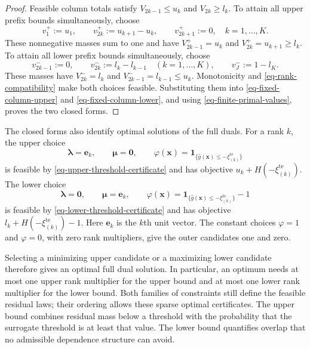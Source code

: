 \documentclass[review,11pt,3p,authoryear,nopreprintline]{elsarticle}
\begin{document}
\begin{proof}
  Feasible column totals satisfy $V_{2k-1}\le u_k$ and $V_{2k}\ge l_k$. To attain all upper prefix bounds simultaneously, choose
  \begin{equation}
    v_1^+:=u_1,\qquad
    v_{2k}^+:=u_{k+1}-u_k,\qquad
    v_{2k+1}^+:=0,\quad k=1,\ldots,K.
    \label{eq-upper-column-allocation}
  \end{equation}
  These nonnegative masses sum to one and have
  $V_{2k-1}^+=u_k$ and $V_{2k}^+=u_{k+1}\ge l_k$.
  To attain all lower prefix bounds simultaneously, choose
  \begin{equation}
    v_{2k-1}^-:=0,\qquad
    v_{2k}^-:=l_k-l_{k-1}\quad(k=1,\ldots,K),
    \qquad v_J^-:=1-l_K.
    \label{eq-lower-column-allocation}
  \end{equation}
  These masses have $V_{2k}^-=l_k$ and
  $V_{2k-1}^-=l_{k-1}\le u_k$.
  Monotonicity and \eqref{eq-rank-compatibility} make both choices feasible. Substituting them into \eqref{eq-fixed-column-upper} and \eqref{eq-fixed-column-lower}, and using \eqref{eq-finite-primal-values}, proves the two closed forms.
\end{proof}

The closed forms also identify optimal solutions of the full duals. For a rank $k$, the upper choice
\[
  \bm\lambda=\bm e_k,\qquad \bm\mu=\bm 0,\qquad
  \varphi(\bm x)=\mathbf1_{\{\hat g(\bm x)\le-\xi_{(k)}^{\mathrm{te}}\}}
\]
is feasible by \eqref{eq-upper-threshold-certificate} and has objective $u_k+H\left(-\xi_{(k)}^{\mathrm{te}}\right)$. The lower choice
\[
  \bm\lambda=\bm 0,\qquad \bm\mu=\bm e_k,\qquad
  \varphi(\bm x)=\mathbf1_{\{\hat g(\bm x)\le-\xi_{(k)}^{\mathrm{te}}\}}-1
\]
is feasible by \eqref{eq-lower-threshold-certificate} and has objective $l_k+H\left(-\xi_{(k)}^{\mathrm{te}}\right)-1$. Here $\bm e_k$ is the $k$th unit vector. The constant choices $\varphi=1$ and $\varphi=0$, with zero rank multipliers, give the outer candidates one and zero.

Selecting a minimizing upper candidate or a maximizing lower candidate therefore gives an optimal full dual solution. In particular, an optimum needs at most one upper rank multiplier for the upper bound and at most one lower rank multiplier for the lower bound. Both families of constraints still define the feasible residual laws; their ordering allows these sparse optimal certificates. The upper bound combines residual mass below a threshold with the probability that the surrogate threshold is at least that value. The lower bound quantifies overlap that no admissible dependence structure can avoid.
\end{document}
